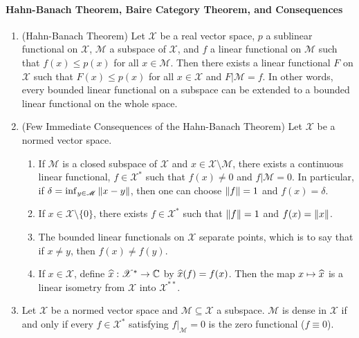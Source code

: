 \documentclass{article}
\begin{document}
	\paragraph{Hahn-Banach Theorem, Baire Category Theorem, and Consequences}
	\begin{enumerate}[resume = real_analysis]
		\item (Hahn-Banach Theorem) Let $\mathscr{X}$ be a real vector space, $p$ a sublinear functional on $\mathscr{X}$, $\mathscr{M}$ a subspace of $\mathscr{X}$, and $f$ a linear functional on $\mathscr{M}$ such that $f(x) \leq p(x)$ for all $x \in \mathscr{M}$. Then there exists a linear functional $F$ on $\mathscr{X}$ such that $F(x) \leq p(x)$ for all $x \in \mathscr{X}$ and $F|\mathscr{M} = f$. In other words, every bounded linear functional on a subspace can be extended to a bounded linear functional on the whole space. 
		\item (Few Immediate Consequences of the Hahn-Banach Theorem) Let $\mathscr{X}$ be a normed vector space. \vspace{-0.25cm}
		\begin{enumerate}[itemsep =-2pt,label = (\arabic{*})]
			\item If $\mathscr{M}$ is a closed subspace of $\mathscr{X}$ and $x \in \mathscr{X}\setminus \mathscr{M}$, there exists a continuous linear functional, $f \in \mathscr{X}^{\ast}$ such that $f(x) \neq 0$ and $f|\mathscr{M} = 0$. In particular, if $\delta = \inf_{y \in \mathscr{M}}\left\Vert x - y \right\Vert$, then one can choose $\left\Vert f \right\Vert= 1$ and $f(x) = \delta$. 
			\item If $x \in \mathscr{X}\setminus \{0\}$, there exists $f \in \mathscr{X}^{\ast}$ such that $\left\Vert f \right\Vert= 1$ and $f(x) = \left\Vert x \right\Vert$. 
			\item The bounded linear functionals on $\mathscr{X}$ separate points, which is to say that if $x \neq y$, then $f(x) \neq f(y)$. 
			\item If $x \in \mathscr{X}$, define $\widehat{x}: \mathscr{X}^{\ast} \to \mathbb{C}$ by $\widehat{x}(f)= f(x)$. Then the map $x \mapsto \widehat{x}$ is a linear isometry from $\mathscr{X}$ into $\mathscr{X}^{\ast\ast}$. 
		\end{enumerate} 
		\item Let $\mathscr{X}$ be a normed vector space and $\mathscr{M} \subseteq \mathscr{X}$ a subspace. $\mathscr{M}$ is dense in $\mathscr{X}$ if and only if every $f \in \mathscr{X}^{\ast}$ satisfying $f|_{\mathscr{M}} = 0$ is the zero functional ($f \equiv 0$). \newline 
		\begin{solutions}

\end{solutions}
\end{enumerate}
\end{document}
